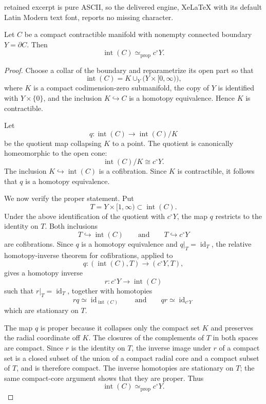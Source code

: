 \documentclass[10pt,a4paper]{amsart}
\newcommand{\Int}{\operatorname{int}}
\newcommand{\id}{\operatorname{id}}
\newcommand{\simeqp}{\simeq_{\mathrm{prop}}}
\begin{document}
retained excerpt is pure ASCII, so the delivered engine, XeLaTeX with its default Latin Modern text font, reports no missing character.
\begin{lemma}\label{lem:interior-cone}
Let \(C\) be a compact contractible manifold with nonempty connected
boundary \(Y=\partial C\).  Then
\[
\Int(C)\simeqp c^\circ Y.
\]
\end{lemma}

\begin{proof}
Choose a collar of the boundary and reparametrize its open part so
that
\[
\Int(C)=K\cup_Y\bigl(Y\times[0,\infty)\bigr),
\]
where \(K\) is a compact codimension-zero submanifold, the copy of
\(Y\) is identified with \(Y\times\{0\}\), and the inclusion
\(K\hookrightarrow C\) is a homotopy equivalence.  Hence \(K\) is
contractible.

Let
\[
q\colon \Int(C)\longrightarrow \Int(C)/K
\]
be the quotient map collapsing \(K\) to a point.  The quotient is
canonically homeomorphic to the open cone:
\[
\Int(C)/K\cong c^\circ Y.
\]
The inclusion \(K\hookrightarrow\Int(C)\) is a cofibration.  Since
\(K\) is contractible, it follows that \(q\) is a homotopy equivalence.

We now verify the proper statement.  Put
\[
T=Y\times[1,\infty)\subset\Int(C).
\]
Under the above identification of the quotient with \(c^\circ Y\),
the map \(q\) restricts to the identity on \(T\).  Both inclusions
\[
T\hookrightarrow\Int(C)
\qquad\text{and}\qquad
T\hookrightarrow c^\circ Y
\]
are cofibrations.  Since \(q\) is a homotopy equivalence and
\(q|_T=\id_T\), the relative homotopy-inverse theorem for
cofibrations, applied to
\[
q\colon(\Int(C),T)\longrightarrow(c^\circ Y,T),
\]
gives a homotopy inverse
\[
r\colon c^\circ Y\longrightarrow\Int(C)
\]
such that \(r|_T=\id_T\), together with homotopies
\[
rq\simeq\id_{\Int(C)}
\qquad\text{and}\qquad
qr\simeq\id_{c^\circ Y}
\]
which are stationary on \(T\).

The map \(q\) is proper because it collapses only the compact set
\(K\) and preserves the radial coordinate off \(K\).  The closures
of the complements of \(T\) in both spaces are compact.  Since \(r\)
is the identity on \(T\), the inverse image under \(r\) of a compact
set is a closed subset of the union of a compact radial core and a
compact subset of \(T\), and is therefore compact.  The inverse
homotopies are stationary on \(T\); the same compact-core argument
shows that they are proper.  Thus
\[
\Int(C)\simeqp c^\circ Y.
\]
\end{proof}
\end{document}
